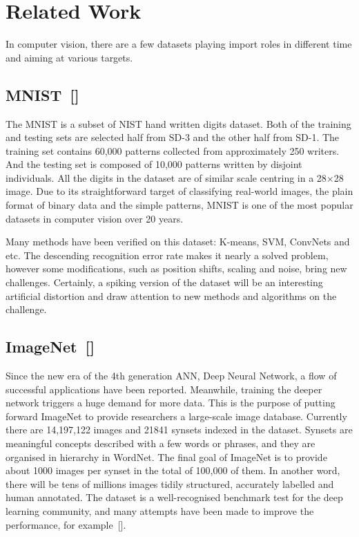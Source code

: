 \section{Related Work}
\label{sec:Related}
In computer vision, there are a few datasets playing import roles in different time and aiming at various targets.
\subsection{MNIST~[\cite{lecun_gradient-based_1998}]}
The MNIST is a subset of NIST hand written digits dataset. 
Both of the training and testing sets are selected half from SD-3 and the other half from SD-1. 
The training set contains 60,000 patterns collected from approximately 250 writers.
And the testing set is composed of 10,000 patterns written by disjoint individuals.
All the digits in the dataset are of similar scale centring in a 28$ \times $28 image.
Due to its straightforward target of classifying real-world images, the plain format of binary data and 
the simple patterns, MNIST is one of the most popular datasets in computer vision over 20 years.

Many methods have been verified on this dataset: K-means, SVM, ConvNets and etc.
The descending recognition error rate makes it nearly a solved problem, however some modifications, such as position shifts, scaling and noise, bring new challenges.
Certainly, a spiking version of the dataset will be an interesting artificial distortion and draw attention to new methods and algorithms on the challenge. 

\subsection{ImageNet~[\cite{deng_imagenet:_2009}]}
Since the new era of the 4th generation ANN, Deep Neural Network, a flow of successful applications have been reported.
Meanwhile, training the deeper network triggers a huge demand for more data.
This is the purpose of putting forward ImageNet to provide researchers a large-scale image database.
Currently there are 14,197,122 images and 21841 synsets indexed in the dataset.
Synsets are meaningful concepts described with a few words or phrases, and they are organised in hierarchy in WordNet.
The final goal of ImageNet is to provide about 1000 images per synset in the total of 100,000 of them.
In another word, there will be tens of millions images tidily structured, accurately labelled and human annotated.
The dataset is a well-recognised benchmark test for the deep learning community, and many attempts have been made to improve the performance, for example~[\cite{krizhevsky2012imagenet}].

